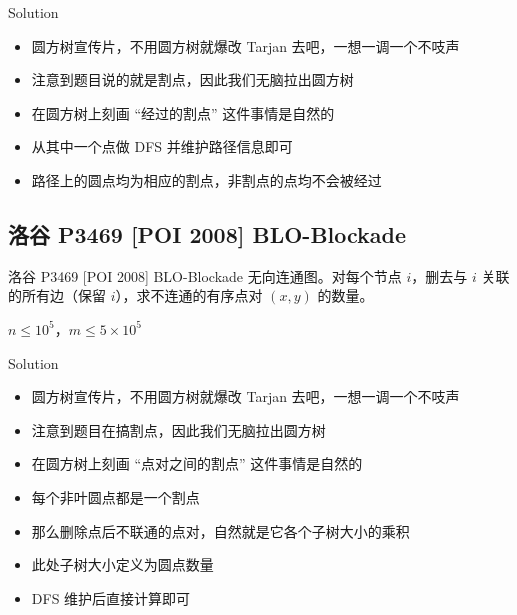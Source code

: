 ﻿\documentclass[aspectratio=169]{ctexbeamer}
\begin{document}
\begin{frame}{Solution}
    \begin{itemize}
        \item 圆方树宣传片，不用圆方树就爆改 Tarjan 去吧，一想一调一个不吱声
        \item 注意到题目说的就是割点，因此我们无脑拉出圆方树
        \item 在圆方树上刻画 “经过的割点” 这件事情是自然的
        \item 从其中一个点做 DFS 并维护路径信息即可
        \item 路径上的圆点均为相应的割点，非割点的点均不会被经过
    \end{itemize}    
\end{frame}














\subsection{洛谷 P3469 [POI 2008] BLO-Blockade}

\begin{frame}{洛谷 P3469 [POI 2008] BLO-Blockade}
      无向连通图。对每个节点 $i$，删去与 $i$ 关联的所有边（保留 $i$），求不连通的有序点对 $(x,y)$ 的数量。
      
      $n\le 10^5$，$m\le 5\times 10^5$
\end{frame}

\begin{frame}{Solution}
    \begin{itemize}
        \item 圆方树宣传片，不用圆方树就爆改 Tarjan 去吧，一想一调一个不吱声
        \item 注意到题目在搞割点，因此我们无脑拉出圆方树
        \item 在圆方树上刻画 “点对之间的割点” 这件事情是自然的
        \item 每个非叶圆点都是一个割点
        \item 那么删除点后不联通的点对，自然就是它各个子树大小的乘积
        \item 此处子树大小定义为圆点数量
        \item DFS 维护后直接计算即可
    \end{itemize}    
\end{frame}
\end{document}

